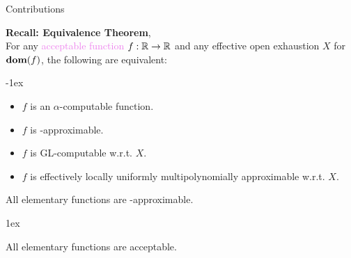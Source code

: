 \begin{frame}{Contributions}
    \vspace{-1em}
    \begin{minipage}[t]{0.54\linewidth}
    {\color{gray}
    \textcolor{OliveGreen}{\textbf{Recall: Equivalence Theorem}, \citep{ModelOfCompForPartFunc_MingQuanFuAndJeffZucker}}\\
    For any \textcolor{violet}{acceptable function} $f:\mathbb{R}\to\mathbb{R}$ and any {effective open exhaustion} $X$ for $\mathbf{dom}(f)$, the following are equivalent:}

    \kern-1ex
        \begin{itemize}
            \setlength\itemsep{-3pt}\color{gray}
            \item $f$ is an $\alpha$-computable function.
            \item $f$ is \textcolor{BrickRed}{\WhileCC-approximable}.
            \item $f$ is GL-computable w.r.t. $X$.
            \item $f$ is effectively locally uniformly multipolynomially approximable w.r.t. $X$.
        \end{itemize}
    \pause 
    \begin{theorem}
        All elementary functions are \WhileCC-approximable.
    \end{theorem}
    \kern1ex
    \pause
    \begin{theorem}
        All elementary functions are acceptable.
    \end{theorem}


\end{minipage}
\end{frame}
